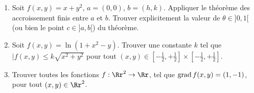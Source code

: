 \documentclass[12pt, class=report,crop=false]{standalone}
\begin{document}
\begin{miniexercices}
\sauteligne
\begin{enumerate}

  \item Soit $f(x,y) = x + y^2$, $a=(0,0)$, $b=(h,k)$. 
  Appliquer le théorème des accroissement finis entre $a$ et $b$. Trouver explicitement la valeur de $\theta \in ]0,1[$ (ou bien le point $c \in ]a,b[$) du théorème.
  
  \item Soit $f(x,y) = \ln (1+x^2-y)$. Trouver une constante $k$ tel que $| f(x,y) \le k \sqrt{x^2+y^2}$ pour tout $(x,y) \in [-\frac12,+\frac12]\times [-\frac12,+\frac12]$.

  \item Trouver toutes les fonctions $f : \Rr^2 \to \Rr$, tel que $\operatorname{grad} f (x,y) = (1,-1)$, pour tout $(x,y) \in \Rr^2$. 
  
\end{enumerate}
\end{miniexercices}




\finchapitre 
\end{document}
